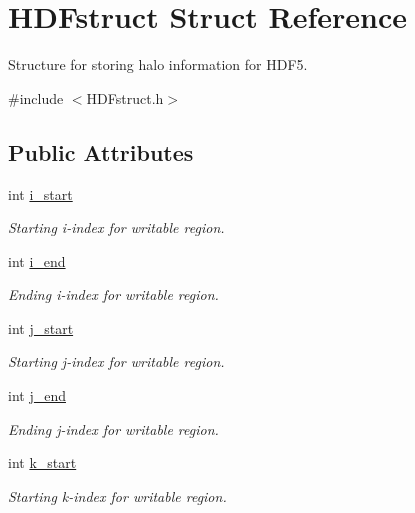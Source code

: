 \hypertarget{struct_h_d_fstruct}{}\section{H\+D\+Fstruct Struct Reference}
\label{struct_h_d_fstruct}


Structure for storing halo information for H\+D\+F5.  




{\ttfamily \#include $<$H\+D\+Fstruct.\+h$>$}

\subsection*{Public Attributes}
\begin{DoxyCompactItemize}
\item 
int \hyperlink{struct_h_d_fstruct_a45867d17153cab93cd572582a9041d4f}{i\+\_\+start}
\begin{DoxyCompactList}\small\item\em Starting i-\/index for writable region. \end{DoxyCompactList}\item 
int \hyperlink{struct_h_d_fstruct_aa8ea8df998eefe394f2123aa4eaa80c5}{i\+\_\+end}
\begin{DoxyCompactList}\small\item\em Ending i-\/index for writable region. \end{DoxyCompactList}\item 
int \hyperlink{struct_h_d_fstruct_a4668543b5338e5c993f1daa212dd1fa2}{j\+\_\+start}
\begin{DoxyCompactList}\small\item\em Starting j-\/index for writable region. \end{DoxyCompactList}\item 
int \hyperlink{struct_h_d_fstruct_a631b78e781eb75647b11fc61f6a57b04}{j\+\_\+end}
\begin{DoxyCompactList}\small\item\em Ending j-\/index for writable region. \end{DoxyCompactList}\item 
int \hyperlink{struct_h_d_fstruct_ae6c59193877bd77a0fb06b4af3f6ae72}{k\+\_\+start}
\begin{DoxyCompactList}\small\item\em Starting k-\/index for writable region. \end{DoxyCompactList}\item 

\end{DoxyCompactItemize}
